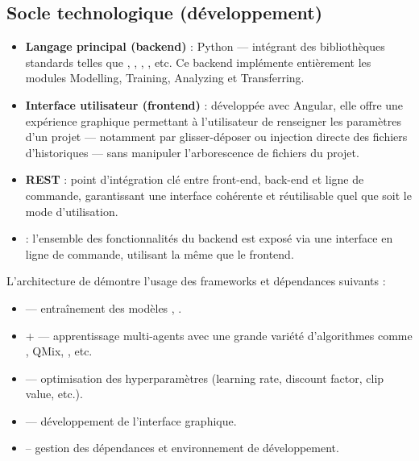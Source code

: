 

\subsection*{Socle technologique (développement)}

\begin{itemize}
  \item \textbf{Langage principal (backend)} : Python — intégrant des bibliothèques standards telles que , , , , etc. Ce backend implémente entièrement les modules Modelling, Training, Analyzing et Transferring.
  \item \textbf{Interface utilisateur (frontend)} : développée avec Angular, elle offre une expérience graphique permettant à l'utilisateur de renseigner les paramètres d'un projet — notamment par glisser-déposer ou injection directe des fichiers d'historiques — sans manipuler l'arborescence de fichiers du projet.
  \item \textbf{ REST} : point d'intégration clé entre front-end, back-end et ligne de commande, garantissant une interface cohérente et réutilisable quel que soit le mode d'utilisation.
  \item \textbf{} : l'ensemble des fonctionnalités du backend est exposé via une interface en ligne de commande, utilisant la même   que le frontend.
\end{itemize}

L'architecture de  démontre l'usage des frameworks et dépendances suivants :
\begin{itemize}
  \item {} — entraînement des modèles , .
  \item {} +  — apprentissage multi-agents avec une grande variété d'algorithmes comme , QMix, , etc.
  \item {} — optimisation des hyperparamètres (learning rate, discount factor,  clip value, etc.).
  \item {} — développement de l'interface graphique.
  \item {} -- gestion des dépendances et environnement de développement.
\end{itemize}



